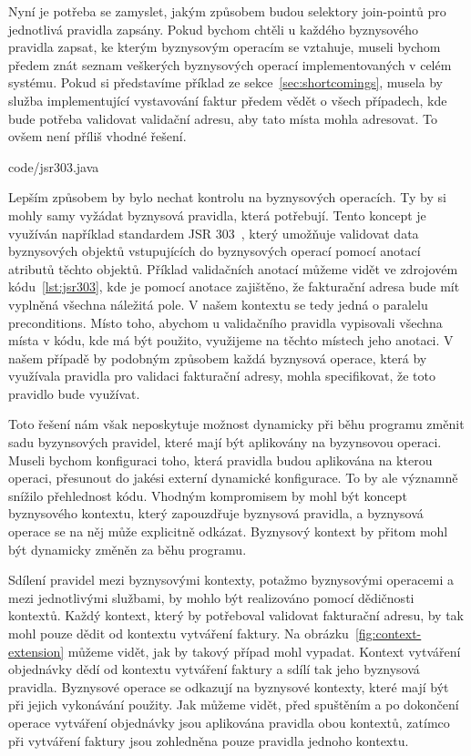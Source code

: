 Nyní je potřeba se zamyslet, jakým způsobem budou selektory join-pointů pro jednotlivá pravidla zapsány.
Pokud bychom chtěli u každého byznysového pravidla zapsat, ke kterým byznysovým operacím se vztahuje,
museli bychom předem znát seznam veškerých byznysových operací implementovaných v celém systému. Pokud si
představíme příklad ze sekce~\ref{sec:shortcomings}, musela by služba implementující vystavování
faktur předem vědět o všech případech, kde bude potřeba validovat validační adresu, aby tato místa mohla
adresovat. To ovšem není příliš vhodné řešení.


{code/jsr303.java}

Lepším způsobem by bylo nechat kontrolu na byznysových operacích. Ty by si mohly samy vyžádat
byznysová pravidla, která potřebují. Tento koncept je využíván například standardem \gls{JSR}
303~\cite{bernard2009jsr}, který umožňuje validovat data byznysových objektů vstupujících do
byznysových operací pomocí anotací atributů těchto objektů. Příklad validačních anotací můžeme vidět ve zdrojovém kódu~\ref{lst:jsr303},
kde je pomocí anotace  zajištěno, že fakturační adresa bude mít vyplněná všechna
náležitá pole. V našem kontextu se tedy jedná o paralelu preconditions. Místo toho, abychom u
validačního pravidla  vypisovali všechna místa v kódu, kde má být použito,
využijeme na těchto místech jeho anotaci. V našem případě by podobným způsobem každá byznysová operace, která
by využívala pravidla pro validaci fakturační adresy, mohla specifikovat, že toto pravidlo bude využívat.

Toto řešení nám však neposkytuje možnost dynamicky při běhu programu změnit sadu byzynsových pravidel,
které mají být aplikovány na byzynsovou operaci. Museli bychom konfiguraci toho, která pravidla
budou aplikována na kterou operaci, přesunout do jakési externí dynamické konfigurace. To by ale významně
snížilo přehlednost kódu. Vhodným kompromisem by mohl být koncept byznysového kontextu, který
zapouzdřuje byznysová pravidla, a byznysová operace se na něj může explicitně odkázat. Byznysový kontext
by přitom mohl být dynamicky změněn za běhu programu.

Sdílení pravidel mezi byznysovými kontexty, potažmo byznysovými operacemi a mezi jednotlivými službami,
by mohlo být realizováno pomocí dědičnosti kontextů. Každý kontext, který by potřeboval validovat fakturační
adresu, by tak mohl pouze dědit od kontextu vytváření faktury. Na obrázku~\ref{fig:context-extension} můžeme vidět,
jak by takový případ mohl vypadat. Kontext vytváření objednávky dědí od kontextu vytváření faktury
a sdílí tak jeho byznysová pravidla. Byznysové operace se odkazují na byznysové kontexty, které mají
být při jejich vykonávání použity. Jak můžeme vidět, před spuštěním a po dokončení operace vytváření
objednávky jsou aplikována pravidla obou kontextů, zatímco při vytváření faktury jsou zohledněna
pouze pravidla jednoho kontextu.

